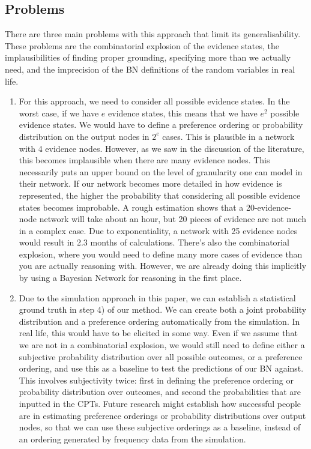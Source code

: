 \documentclass[12pt]{article}
\begin{document}
\subsection{Problems}

There are three main problems with this approach that limit its generalisability. These problems are the combinatorial explosion of the evidence states, the implausibilities of finding proper grounding, specifying more than we actually need, and the imprecision of the BN definitions of the random variables in real life.

\begin{enumerate}

\item For this approach, we need to consider all possible evidence states. In the worst case, if we have $e$ evidence states, this means that we have $e^2$ possible evidence states. We would have to define a preference ordering or probability distribution on the output nodes in $2^e$ cases. This is plausible in a network with 4 evidence nodes. However, as we saw in the discussion of the literature, this becomes implausible when there are many evidence nodes. 
This necessarily puts an upper bound on the level of granularity one can model in their network. If our network becomes more detailed in how evidence is represented, the higher the probability that considering all possible evidence states becomes improbable. A rough estimation shows that a 20-evidence-node network will take about an hour, but 20 pieces of evidence are not much in a complex case. Due to exponentiality, a network with 25 evidence nodes would result in 2.3 months of calculations.
There's also the combinatorial explosion, where you would need to define many more cases of evidence than you are actually reasoning with. However, we are already doing this implicitly by using a Bayesian Network for reasoning in the first place. 

\item Due to the simulation approach in this paper, we can establish a statistical ground truth in step 4) of our method. We can create both a joint probability distribution and a preference ordering automatically from the simulation. In real life, this would have to be elicited in some way. Even if we assume that we are not in a combinatorial explosion, we would still need to define either a subjective probability distribution over all possible outcomes, or a preference ordering, and use this as a baseline to test the predictions of our BN against. This involves subjectivity twice: first in defining the preference ordering or probability distribution over outcomes, and second the probabilities that are inputted in the CPTs. Future research might establish how successful people are in estimating preference orderings or probability distributions over output nodes, so that we can use these subjective orderings as a baseline, instead of an ordering generated by frequency data from the simulation. 


\end{enumerate}
\end{document}
